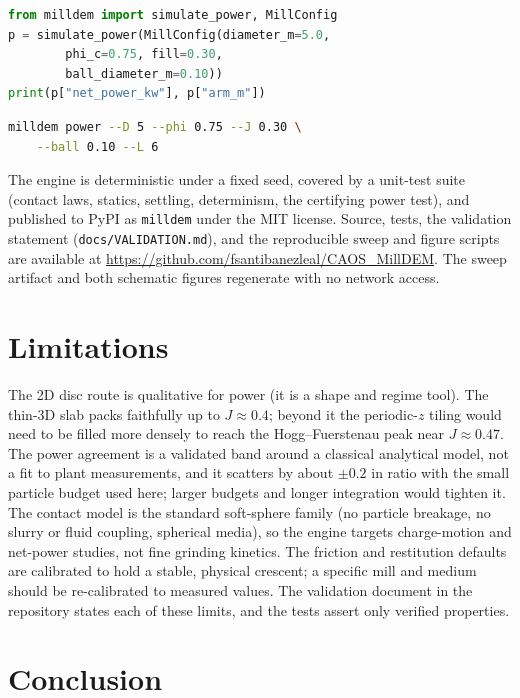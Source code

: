 \documentclass[journal]{IEEEtran}
\begin{document}
\begin{lstlisting}[language=Python]
from milldem import simulate_power, MillConfig
p = simulate_power(MillConfig(diameter_m=5.0,
        phi_c=0.75, fill=0.30,
        ball_diameter_m=0.10))
print(p["net_power_kw"], p["arm_m"])
\end{lstlisting}

\begin{lstlisting}[language=bash]
milldem power --D 5 --phi 0.75 --J 0.30 \
    --ball 0.10 --L 6
\end{lstlisting}

The engine is deterministic under a fixed seed, covered by a unit-test suite (contact laws, statics, settling,
determinism, the certifying power test), and published to PyPI as \texttt{milldem} under the MIT license. Source,
tests, the validation statement (\texttt{docs/VALIDATION.md}), and the reproducible sweep and figure scripts are
available at \url{https://github.com/fsantibanezleal/CAOS_MillDEM}. The sweep artifact and both schematic
figures regenerate with no network access.

\section{Limitations}\label{sec:limits}

The 2D disc route is qualitative for power (it is a shape and regime tool). The thin-3D slab
packs faithfully up to $J\approx0.4$; beyond it the periodic-$z$ tiling would need to be filled more densely to
reach the Hogg--Fuerstenau peak near $J\approx0.47$. The power agreement is a validated band around a classical
analytical model, not a fit to plant measurements, and it scatters by about $\pm0.2$ in ratio with the small
particle budget used here; larger budgets and longer integration would tighten it. The contact model is the
standard soft-sphere family (no particle breakage, no slurry or fluid coupling, spherical media), so the engine
targets charge-motion and net-power studies, not fine grinding kinetics. The friction and restitution defaults
are calibrated to hold a stable, physical crescent; a specific mill and medium should be re-calibrated to
measured values. The validation document in the repository states each of these limits, and the tests assert
only verified properties.

\section{Conclusion}
\end{document}
